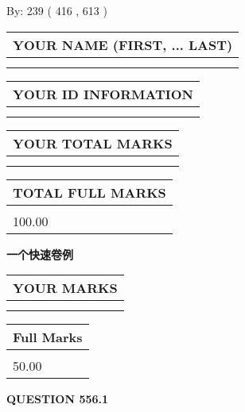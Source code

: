 \documentclass{ctexart}
\begin{document}
   
\hspace{1.0in} By: 
 239 ( 416 ,  613 )
   
   
   
   
\newpage 
\setcounter{page}{ 
   556001 } 
   
   
   
   
\noindent\begin{tabular}{|l|}
\hline
YOUR NAME (FIRST, ... LAST)  \\
\hline
 \\ 
 \\ 
\hline
\end{tabular}
\hspace{0.05in} \begin{tabular}{|l|}
\hline
 YOUR   ID   INFORMATION  \\
\hline
 \\ 
 \\ 
\hline
\end{tabular}
   
   
\vspace{0.2in}\noindent\begin{tabular}{|l|}
\hline
YOUR TOTAL MARKS  \\
\hline
 \\ 
 \\ 
\hline
\end{tabular}
\hspace{0.05in} \begin{tabular}{|l|}
\hline
TOTAL FULL MARKS  \\
\hline
 \\ 
100.00 \\
\hline
\end{tabular}
   
   
 \vspace{0.2in}
{\LARGE {\textbf{ 一个快速卷例}}}
   
   
  
\vspace{0.2in}
  
\noindent\begin{tabular}{|l|}
\hline
 YOUR MARKS  \\
\hline
 \\ 
 \\ 
\hline
\end{tabular}
\hspace{0.05in} \begin{tabular}{|l|}
\hline
 Full Marks  \\
\hline
 \\ 
50.00 \\
\hline
\end{tabular}
{\textbf{\Large{QUESTION
556.1 
}}}
  
\end{document}
